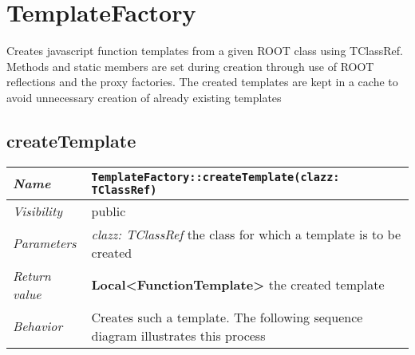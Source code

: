 \chapter{TemplateFactory}
Creates javascript function templates from a given ROOT class using TClassRef. Methods and static members are set during creation through use of ROOT reflections and the proxy factories. 
The created templates are kept in a cache to avoid unnecessary creation of already existing templates
\section{createTemplate}
\begin{longtable}{p{3cm} @{\hskip 1cm} p{12cm}}
 \hline
\textit{Name} & \texttt{TemplateFactory::createTemplate(clazz: TClassRef)}\\
\hline
 \textit{Visibility} & public\\
\hline
\textit{Parameters} & \textit{clazz: TClassRef} the class for which a template is to be created \\
\hline
\textit{Return value} & \textbf{ Local<FunctionTemplate>} the created template\\
  \hline
 \textit{Behavior} & Creates such a template. The following sequence diagram illustrates this process \\
\hline
\end{longtable} \pagebreak
 
